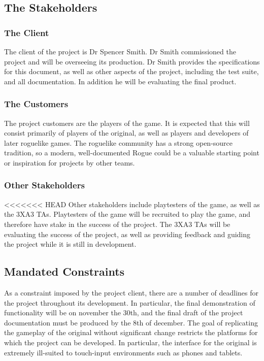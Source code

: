 \documentclass[12pt, titlepage]{article}
\begin{document}
	\subsection{The Stakeholders}

		\subsubsection{The Client}

		The client of the project is Dr Spencer Smith. Dr Smith commissioned the project and will be overseeing its production. Dr Smith provides the specifications for this document, as well as other aspects of the project, including the test suite, and all documentation. In addition he will be evaluating the final product.

		\subsubsection{The Customers}

		The project customers are the players of the game. It is expected that this will consist primarily of players of the original, as well as players and developers of later roguelike games. The roguelike community has a strong open-source tradition, so a modern, well-documented Rogue could be a valuable starting point or inspiration for projects by other teams.

		\subsubsection{Other Stakeholders}

<<<<<<< HEAD
Other stakeholders include playtesters of the game, as well as the 3XA3 TAs. Playtesters of the game will be recruited to play the game, and therefore have stake in the success of the project. The 3XA3 TAs will be evaluating the success of the project, as well as providing feedback and guiding the project while it is still in development.

\subsection{Mandated Constraints}

As a constraint imposed by the project client, there are a number of deadlines for the project throughout its development. In particular, the final demonstration of functionality will be on november the 30th, and the final draft of the project documentation must be produced by the 8th of december. The goal of replicating the gameplay of the original without significant change restricts the platforms for which the project can be developed. In particular, the interface for the original is extremely ill-suited to touch-input environments such as phones and tablets. 
\end{document}
